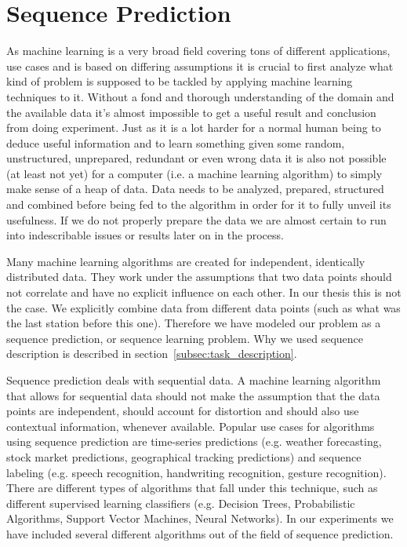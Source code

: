 \newpage
\section{Sequence Prediction}
As machine learning is a very broad field covering tons of different applications, use cases and is based on differing assumptions it is crucial to first analyze what kind of problem is supposed to be tackled by applying machine learning techniques to it. Without a fond and thorough understanding of the domain and the available data it's almost impossible to get a useful result and conclusion from doing experiment. Just as it is a lot harder for a normal human being to deduce useful information and to learn something given some random, unstructured, unprepared, redundant or even wrong data it is also not possible (at least not yet) for a computer (i.e. a machine learning algorithm) to simply make sense of a heap of data. Data needs to be analyzed, prepared, structured and combined before being fed to the algorithm in order for it to fully unveil its usefulness. If we do not properly prepare the data we are almost certain to run into indescribable issues or results later on in the process.

Many machine learning algorithms are created for independent, identically distributed data. They work under the assumptions that two data points should not correlate and have no explicit influence on each other. In our thesis this is not the case. We explicitly combine data from different data points (such as what was the last station before this one). Therefore we have modeled our problem as a sequence prediction, or sequence learning problem. Why we used sequence description is described in section~\ref{subsec:task_description}. 

Sequence prediction deals with sequential data. A machine learning algorithm that allows for sequential data should not make the assumption that the data points are independent, should account for distortion and should also use contextual information, whenever available. Popular use cases for algorithms using sequence prediction are time-series predictions (e.g. weather forecasting, stock market predictions, geographical tracking predictions) and sequence labeling (e.g. speech recognition, handwriting recognition, gesture recognition). There are different types of algorithms that fall under this technique, such as different supervised learning classifiers (e.g. Decision Trees, Probabilistic Algorithms, Support Vector Machines, Neural Networks). In our experiments we have included several different algorithms out of the field of sequence prediction.

